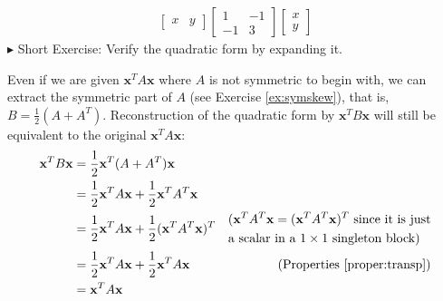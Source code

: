 \begin{align*}
\begin{bmatrix}
x & y
\end{bmatrix}
\begin{bmatrix}
1 & -1 \\
-1 & 3
\end{bmatrix}
\begin{bmatrix}
x \\
y
\end{bmatrix}
\end{align*}
$\blacktriangleright$ Short Exercise: Verify the quadratic form by expanding it.\footnotemark \par
Even if we are given $\textbf{x}^TA\textbf{x}$ where $A$ is not symmetric to begin with, we can extract the symmetric part of $A$ (see Exercise \ref{ex:symskew}), that is, $B = \frac{1}{2}(A + A^T)$. Reconstruction of the quadratic form by $\textbf{x}^TB\textbf{x}$ will still be equivalent to the original $\textbf{x}^TA\textbf{x}$:
\begin{align*}
\textbf{x}^TB\textbf{x} &= \frac{1}{2}\textbf{x}^T(A + A^T)\textbf{x} \\
&= \frac{1}{2}\textbf{x}^TA\textbf{x} + \frac{1}{2}\textbf{x}^TA^T\textbf{x} \\
&= \frac{1}{2}\textbf{x}^TA\textbf{x} + \frac{1}{2}(\textbf{x}^TA^T\textbf{x})^T & \begin{aligned}
&\text{($\textbf{x}^TA^T\textbf{x} = (\textbf{x}^TA^T\textbf{x})^T$ since it is just} \\
&\text{a scalar in a $1 \times 1$ singleton block)}  
\end{aligned} \\
&= \frac{1}{2}\textbf{x}^TA\textbf{x} + \frac{1}{2}\textbf{x}^TA\textbf{x} & \text{(Properties \ref{proper:transp})} \\
&= \textbf{x}^TA\textbf{x}
\end{align*}
